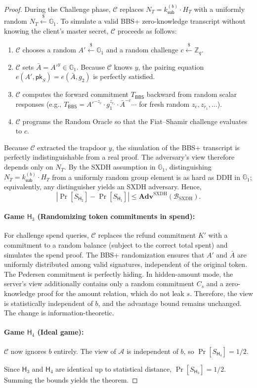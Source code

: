 \documentclass[11pt]{article}
\theoremstyle{definitionstyle}
\theoremstyle{plain}
\newcommand{\advantage}[1]{\mathbf{Adv}^{\mathrm{#1}}}
\begin{document}
\begin{proof}
During the Challenge phase, $\mathcal{C}$ replaces $N_T = k_{\mathsf{sub}}^{(b)} \cdot H_T$ with a uniformly random $N_T \xleftarrow{\$} \mathbb{G}_1$.  To simulate a valid BBS+ zero-knowledge transcript without knowing the client's master secret, $\mathcal{C}$ proceeds as follows:
\begin{enumerate}[leftmargin=*,nosep]
  \item $\mathcal{C}$ chooses a random $A' \xleftarrow{\$} \mathbb{G}_1$ and a random challenge $c \xleftarrow{\$} \mathbb{Z}_q$.
  \item $\mathcal{C}$ sets $\bar{A} = A'^y \in \mathbb{G}_1$.  Because $\mathcal{C}$ knows $y$, the pairing equation $e(A', \mathsf{pk}_S) = e(\bar{A}, g_2)$ is perfectly satisfied.
  \item $\mathcal{C}$ computes the forward commitment $T_{\mathsf{BBS}}$ backward from random scalar responses (e.g., $T_{\mathsf{BBS}} = A'^{-z_e} \cdot g_1^{z_{r_1}} \cdot \bar{A}^{-c} \cdots$ for fresh random $z_e, z_{r_1},\dots$).
  \item $\mathcal{C}$ programs the Random Oracle so that the Fiat--Shamir challenge evaluates to $c$.
\end{enumerate}
Because $\mathcal{C}$ extracted the trapdoor $y$, the simulation of the BBS+ transcript is perfectly indistinguishable from a real proof.  The adversary's view therefore depends only on $N_T$.  By the SXDH assumption in $\mathbb{G}_1$, distinguishing $N_T = k_{\mathsf{sub}}^{(b)} \cdot H_T$ from a uniformly random group element is as hard as DDH in $\mathbb{G}_1$; equivalently, any distinguisher yields an SXDH adversary.  Hence,
\[
|\Pr[S_{\mathsf{H}_2}] - \Pr[S_{\mathsf{H}_1}]| \le \advantage{SXDH}(\mathcal{B}_{\text{SXDH}}).
\]

\paragraph{Game $\mathsf{H}_3$ (Randomizing token commitments in spend):} For challenge spend queries, $\mathcal{C}$ replaces the refund commitment $K'$ with a commitment to a random balance (subject to the correct total spent) and simulates the spend proof. The BBS+ randomization ensures that $A'$ and $\bar{A}$ are uniformly distributed among valid signatures, independent of the original token. The Pedersen commitment is perfectly hiding. In hidden-amount mode, the server's view additionally contains only a random commitment $C_s$ and a zero-knowledge proof for the amount relation, which do not leak $s$. Therefore, the view is statistically independent of $b$, and the advantage bound remains unchanged. The change is information-theoretic.

\paragraph{Game $\mathsf{H}_4$ (Ideal game):} $\mathcal{C}$ now ignores $b$ entirely. The view of $\mathcal{A}$ is independent of $b$, so $\Pr[S_{\mathsf{H}_4}] = 1/2$.

Since $\mathsf{H}_3$ and $\mathsf{H}_4$ are identical up to statistical distance, $\Pr[S_{\mathsf{H}_3}] = 1/2$. Summing the bounds yields the theorem.
\end{proof}
\end{document}
